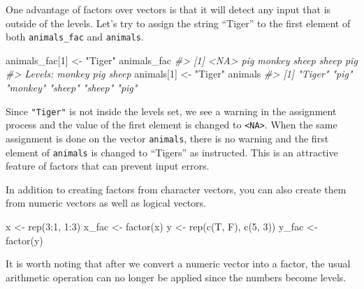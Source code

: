 \documentclass[
]{book}
\newenvironment{Shaded}{\begin{snugshade}}{\end{snugshade}}
\newcommand{\CommentTok}[1]{\textcolor[rgb]{0.56,0.35,0.01}{\textit{#1}}}
\newcommand{\DecValTok}[1]{\textcolor[rgb]{0.00,0.00,0.81}{#1}}
\newcommand{\FunctionTok}[1]{\textcolor[rgb]{0.00,0.00,0.00}{#1}}
\newcommand{\NormalTok}[1]{#1}
\newcommand{\OtherTok}[1]{\textcolor[rgb]{0.56,0.35,0.01}{#1}}
\newcommand{\SpecialCharTok}[1]{\textcolor[rgb]{0.00,0.00,0.00}{#1}}
\newcommand{\StringTok}[1]{\textcolor[rgb]{0.31,0.60,0.02}{#1}}
\begin{document}
One advantage of factors over vectors is that it will detect any input that is outside of the levels. Let's try to assign the string ``Tiger'' to the first element of both \texttt{animals\_fac} and \texttt{animals}.

\begin{Shaded}
\begin{Highlighting}[]
\NormalTok{animals\_fac[}\DecValTok{1}\NormalTok{] }\OtherTok{\textless{}{-}} \StringTok{"Tiger"}
\NormalTok{animals\_fac}
\CommentTok{\#\textgreater{} [1] \textless{}NA\textgreater{}   pig    monkey sheep  sheep  pig   }
\CommentTok{\#\textgreater{} Levels: monkey pig sheep}
\NormalTok{animals[}\DecValTok{1}\NormalTok{] }\OtherTok{\textless{}{-}} \StringTok{"Tiger"}
\NormalTok{animals}
\CommentTok{\#\textgreater{} [1] "Tiger"  "pig"    "monkey" "sheep"  "sheep"  "pig"}
\end{Highlighting}
\end{Shaded}

Since \texttt{"Tiger"} is not inside the levels set, we see a warning in the assignment process and the value of the first element is changed to \texttt{\textless{}NA\textgreater{}}. When the same assignment is done on the vector \texttt{animals}, there is no warning and the first element of \texttt{animals} is changed to ``Tigers'' as instructed. This is an attractive feature of factors that can prevent input errors.

In addition to creating factors from character vectors, you can also create them from numeric vectors as well as logical vectors.

\begin{Shaded}
\begin{Highlighting}[]
\NormalTok{x }\OtherTok{\textless{}{-}} \FunctionTok{rep}\NormalTok{(}\DecValTok{3}\SpecialCharTok{:}\DecValTok{1}\NormalTok{, }\DecValTok{1}\SpecialCharTok{:}\DecValTok{3}\NormalTok{)}
\NormalTok{x\_fac }\OtherTok{\textless{}{-}} \FunctionTok{factor}\NormalTok{(x)}
\NormalTok{y }\OtherTok{\textless{}{-}} \FunctionTok{rep}\NormalTok{(}\FunctionTok{c}\NormalTok{(T, F), }\FunctionTok{c}\NormalTok{(}\DecValTok{5}\NormalTok{, }\DecValTok{3}\NormalTok{))}
\NormalTok{y\_fac }\OtherTok{\textless{}{-}} \FunctionTok{factor}\NormalTok{(y)}
\end{Highlighting}
\end{Shaded}

It is worth noting that after we convert a numeric vector into a factor, the usual arithmetic operation can no longer be applied since the numbers become levels.
\end{document}

